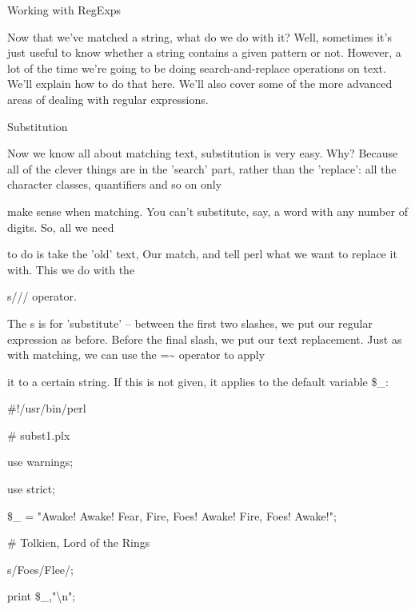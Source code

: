 \documentclass[a4paper,11pt]{book}
\begin{document}
\noindent 

\noindent Working with RegExps

\noindent 

\noindent Now that we've matched a string, what do we do with it? Well, sometimes it's just useful to know whether a string contains a given pattern or not. However, a lot of the time we're going to be doing search-and-replace operations on text. We'll explain how to do that here. We'll also cover some of the more advanced areas of dealing with regular expressions.

\noindent 

\noindent Substitution

\noindent 

\noindent Now we know all about matching text, substitution is very easy. Why? Because all of the clever things are in the 'search' part, rather than the 'replace': all the character classes, quantifiers and so on only

\noindent make sense when matching. You can't substitute, say, a word with any number of digits. So, all we need

\noindent to do is take the 'old' text, Our match, and tell perl what we want to replace it with. This we do with the

\noindent s/// operator.

\noindent 

\noindent The s is for 'substitute' -- between the first two slashes, we put our regular expression as before. Before the final slash, we put our text replacement. Just as with matching, we can use the =\~{} operator to apply

\noindent it to a certain string. If this is not given, it applies to the default variable \$\_:

\noindent 

\noindent \#!/usr/bin/perl

\noindent \# subst1.plx

\noindent use warnings;

\noindent use strict;

\noindent 

\noindent \$\_  = "Awake! Awake! Fear, Fire, Foes! Awake! Fire, Foes! Awake!";

\noindent \# Tolkien, Lord of the Rings

\noindent 

\noindent s/Foes/Flee/;

\noindent print \$\_,"\textbackslash n";
\end{document}
